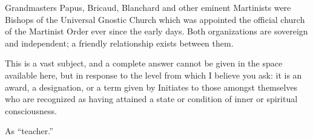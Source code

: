 Grandmasters Papus, Bricaud, Blanchard and other eminent Martinists were Bishops of the Universal Gnostic Church which was appointed the official church of the Martinist Order ever since the early days. Both organizations are sovereign and independent; a friendly relationship exists between them. 


This is a vast subject, and a complete answer cannot be given in the space available here, but in response to the level from which I believe you ask: it is an award, a designation, or a term given by Initiates to those amongst themselves who are recognized as having attained a state or condition of inner or spiritual consciousness. 


As ``teacher.''